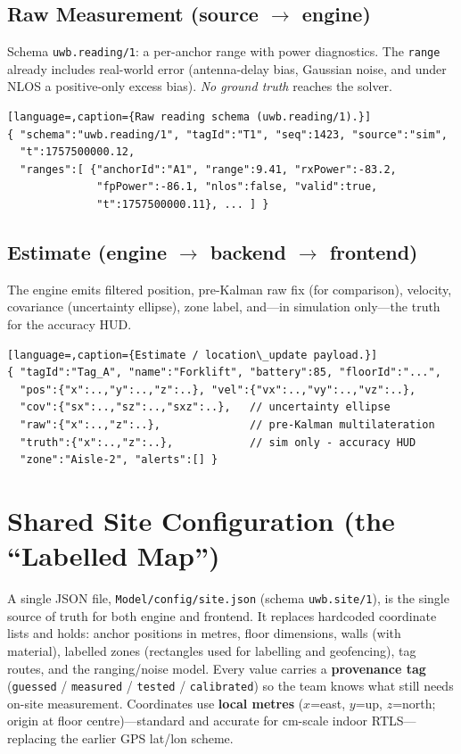 \documentclass[a4paper,12pt,onecolumn]{report}
\begin{document}
\subsection{Raw Measurement (source $\rightarrow$ engine)}
Schema \texttt{uwb.reading/1}: a per-anchor range with power diagnostics. The
\texttt{range} already includes real-world error (antenna-delay bias, Gaussian
noise, and under NLOS a positive-only excess bias). \emph{No ground truth}
reaches the solver.
\begin{lstlisting}[language=,caption={Raw reading schema (uwb.reading/1).}]
{ "schema":"uwb.reading/1", "tagId":"T1", "seq":1423, "source":"sim",
  "t":1757500000.12,
  "ranges":[ {"anchorId":"A1", "range":9.41, "rxPower":-83.2,
              "fpPower":-86.1, "nlos":false, "valid":true,
              "t":1757500000.11}, ... ] }
\end{lstlisting}

\subsection{Estimate (engine $\rightarrow$ backend $\rightarrow$ frontend)}
The engine emits filtered position, pre-Kalman raw fix (for comparison),
velocity, covariance (uncertainty ellipse), zone label, and---in simulation
only---the truth for the accuracy HUD.
\begin{lstlisting}[language=,caption={Estimate / location\_update payload.}]
{ "tagId":"Tag_A", "name":"Forklift", "battery":85, "floorId":"...",
  "pos":{"x":..,"y":..,"z":..}, "vel":{"vx":..,"vy":..,"vz":..},
  "cov":{"sx":..,"sz":..,"sxz":..},   // uncertainty ellipse
  "raw":{"x":..,"z":..},              // pre-Kalman multilateration
  "truth":{"x":..,"z":..},            // sim only - accuracy HUD
  "zone":"Aisle-2", "alerts":[] }
\end{lstlisting}

\section{Shared Site Configuration (the ``Labelled Map'')}
A single JSON file, \texttt{Model/config/site.json} (schema \texttt{uwb.site/1}),
is the single source of truth for both engine and frontend. It replaces
hardcoded coordinate lists and holds: anchor positions in metres, floor
dimensions, walls (with material), labelled zones (rectangles used for labelling
and geofencing), tag routes, and the ranging/noise model. Every value carries a
\textbf{provenance tag} (\texttt{guessed} / \texttt{measured} / \texttt{tested} /
\texttt{calibrated}) so the team knows what still needs on-site measurement.
Coordinates use \textbf{local metres} ($x$=east, $y$=up, $z$=north; origin at
floor centre)---standard and accurate for cm-scale indoor RTLS---replacing the
earlier GPS lat/lon scheme.
\end{document}
